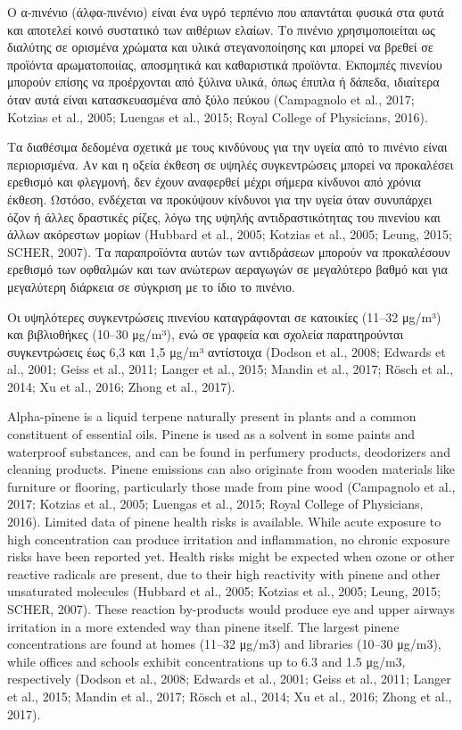 Ο α-πινένιο (άλφα-πινένιο) είναι ένα υγρό τερπένιο που απαντάται φυσικά στα φυτά και αποτελεί κοινό συστατικό των αιθέριων ελαίων. Το πινένιο χρησιμοποιείται ως διαλύτης σε ορισμένα χρώματα και υλικά στεγανοποίησης και μπορεί να βρεθεί σε προϊόντα αρωματοποιίας, αποσμητικά και καθαριστικά προϊόντα. Εκπομπές πινενίου μπορούν επίσης να προέρχονται από ξύλινα υλικά, όπως έπιπλα ή δάπεδα, ιδιαίτερα όταν αυτά είναι κατασκευασμένα από ξύλο πεύκου (Campagnolo et al., 2017; Kotzias et al., 2005; Luengas et al., 2015; Royal College of Physicians, 2016).

Τα διαθέσιμα δεδομένα σχετικά με τους κινδύνους για την υγεία από το πινένιο είναι περιορισμένα. Αν και η οξεία έκθεση σε υψηλές συγκεντρώσεις μπορεί να προκαλέσει ερεθισμό και φλεγμονή, δεν έχουν αναφερθεί μέχρι σήμερα κίνδυνοι από χρόνια έκθεση. Ωστόσο, ενδέχεται να προκύψουν κίνδυνοι για την υγεία όταν συνυπάρχει όζον ή άλλες δραστικές ρίζες, λόγω της υψηλής αντιδραστικότητας του πινενίου και άλλων ακόρεστων μορίων (Hubbard et al., 2005; Kotzias et al., 2005; Leung, 2015; SCHER, 2007). Τα παραπροϊόντα αυτών των αντιδράσεων μπορούν να προκαλέσουν ερεθισμό των οφθαλμών και των ανώτερων αεραγωγών σε μεγαλύτερο βαθμό και για μεγαλύτερη διάρκεια σε σύγκριση με το ίδιο το πινένιο.

Οι υψηλότερες συγκεντρώσεις πινενίου καταγράφονται σε κατοικίες (11–32 μg/m³) και βιβλιοθήκες (10–30 μg/m³), ενώ σε γραφεία και σχολεία παρατηρούνται συγκεντρώσεις έως 6,3 και 1,5 μg/m³ αντίστοιχα (Dodson et al., 2008; Edwards et al., 2001; Geiss et al., 2011; Langer et al., 2015; Mandin et al., 2017; Rösch et al., 2014; Xu et al., 2016; Zhong et al., 2017).

Alpha-pinene is a liquid terpene naturally present in plants and a common constituent of essential oils. Pinene is used as a solvent in some paints and waterproof substances, and can be found in perfumery products, deodorizers and cleaning products. Pinene emissions can also originate from wooden materials like furniture or flooring, particularly those made from pine wood (Campagnolo et al., 2017; Kotzias et al., 2005; Luengas et al., 2015; Royal College of Physicians, 2016). Limited data of pinene health risks is available. While acute exposure to high concentration can produce irritation and inflammation, no chronic exposure risks have been reported yet. Health risks might be expected when ozone or other reactive radicals are present, due to their high reactivity with pinene and other unsaturated molecules (Hubbard et al., 2005; Kotzias et al., 2005; Leung, 2015; SCHER, 2007). These reaction by-products would produce eye and upper airways irritation in a more extended way than pinene itself. The largest pinene concentrations are found at homes (11–32 μg/m3) and libraries (10–30 μg/m3), while offices and schools exhibit concentrations up to 6.3 and 1.5 μg/m3, respectively (Dodson et al., 2008; Edwards et al., 2001; Geiss et al., 2011; Langer et al., 2015; Mandin et al., 2017; Rösch et al., 2014; Xu et al., 2016; Zhong et al., 2017).

